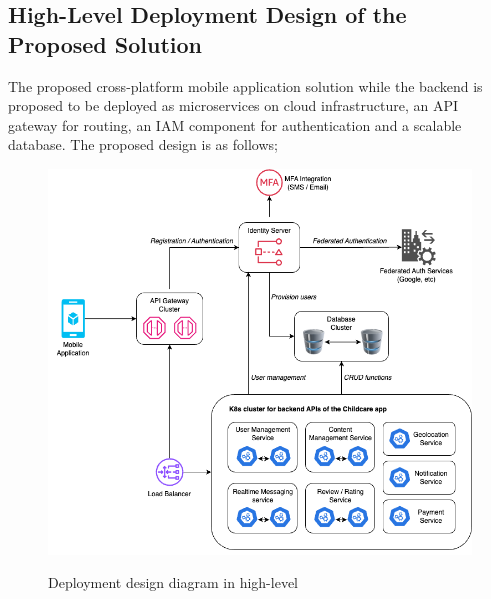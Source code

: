 \subsection{High-Level Deployment Design of the Proposed Solution}

The proposed cross-platform mobile application solution while the backend is proposed to be deployed as microservices on cloud infrastructure, an API gateway for routing, an IAM component for authentication and a scalable database. The proposed design is as follows; 


\begin{figure}[htp]
	\center
	{{\includegraphics[width=0.9\columnwidth,keepaspectratio]{Figures/diagram.png}}}
	\caption{Deployment design diagram in high-level}%
	\label{fig:deploymentdiagram}%
\end{figure}


